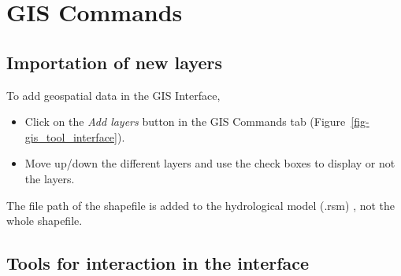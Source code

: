 \documentclass[
  letterpaper,
  DIV=11,
  numbers=noendperiod]{scrreprt}
\begin{document}
\hypertarget{gis-commands}{%
\chapter{GIS Commands}\label{gis-commands}}

\hypertarget{importation-of-new-layers}{%
\section{Importation of new layers}\label{importation-of-new-layers}}

To add geospatial data in the GIS Interface,

\begin{itemize}
\item
  {Click on the \emph{Add layers} button in the GIS Commands tab
  (Figure~\ref{fig-gis_tool_interface}).}
\item
  {Move up/down the different layers and use the check boxes to display
  or not the layers.}
\end{itemize}

\begin{tcolorbox}[standard jigsaw,left=2mm, arc=.35mm, toprule=.15mm, colbacktitle=quarto-callout-important-color!10!white, coltitle=black, leftrule=.75mm, bottomtitle=1mm, colframe=quarto-callout-important-color-frame, colback=white, toptitle=1mm, titlerule=0mm, rightrule=.15mm, title=\textcolor{quarto-callout-important-color}{\faExclamation}\hspace{0.5em}{Important}, bottomrule=.15mm, opacityback=0, opacitybacktitle=0.6]
The file path of the shapefile is added to the hydrological model (.rsm)
, not the whole shapefile.
\end{tcolorbox}

\hypertarget{tools-for-interaction-in-the-interface}{%
\section{Tools for interaction in the
interface}\label{tools-for-interaction-in-the-interface}}
\end{document}
